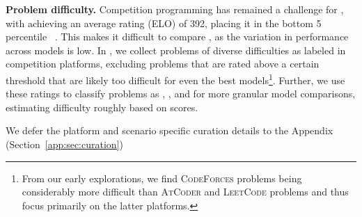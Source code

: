 \noindent \textbf{Problem difficulty.}
Competition programming has remained a challenge for \llms{}, with \gptfour{} achieving an average \codeforces{} rating (ELO) of 392, placing it in the bottom 5 percentile ~\citep{openai2023gpt}. 
This makes it difficult to compare \llms{}, as the variation in performance across models is low.
In \livecodebench{}, we collect problems of diverse difficulties as labeled in competition platforms, excluding problems that are rated above a certain threshold that are likely too difficult for even the best models\footnote{From our early explorations, we find {\scriptsize	\textsc{CodeForces}} problems being considerably more difficult than {\scriptsize \textsc{AtCoder}} and {\scriptsize \textsc{LeetCode}}  problems and thus focus primarily on the latter platforms.}.
Further, we use these ratings to classify problems as \easy{}, \medium{}, and \hard{} for more granular model comparisons, estimating difficulty roughly based on \humaneval{} scores.



We defer the platform and scenario specific curation details to the Appendix (Section~\ref{app:sec:curation})